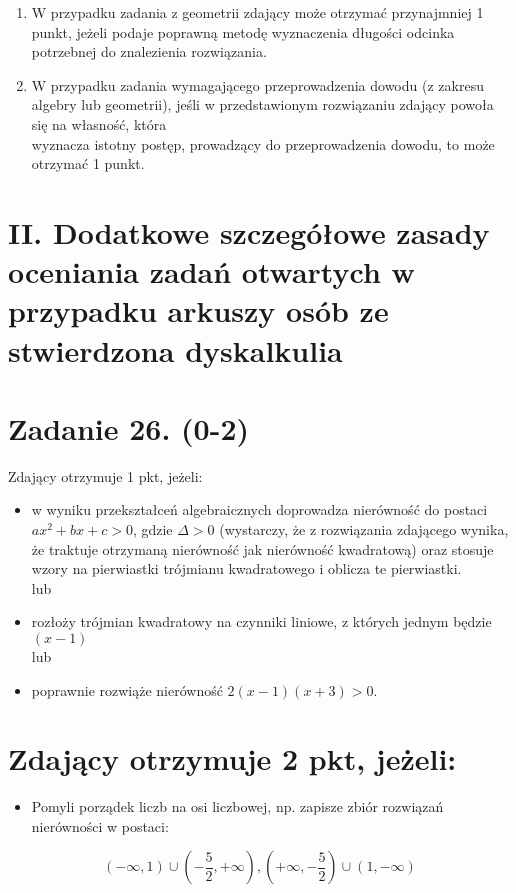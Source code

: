 \documentclass[10pt]{article}
\begin{document}
\begin{enumerate}
  \item W przypadku zadania z geometrii zdający może otrzymać przynajmniej 1 punkt, jeżeli podaje poprawną metodę wyznaczenia długości odcinka potrzebnej do znalezienia rozwiązania.
  \item W przypadku zadania wymagającego przeprowadzenia dowodu (z zakresu algebry lub geometrii), jeśli w przedstawionym rozwiązaniu zdający powoła się na własność, która\\
wyznacza istotny postęp, prowadzący do przeprowadzenia dowodu, to może otrzymać 1 punkt.
\end{enumerate}

\section*{II. Dodatkowe szczegółowe zasady oceniania zadań otwartych w przypadku arkuszy osób ze stwierdzona dyskalkulia}
\section*{Zadanie 26. (0-2)}
Zdający otrzymuje 1 pkt, jeżeli:

\begin{itemize}
  \item w wyniku przekształceń algebraicznych doprowadza nierówność do postaci $a x^{2}+b x+c>0$, gdzie $\Delta>0$ (wystarczy, że z rozwiązania zdającego wynika, że traktuje otrzymaną nierówność jak nierówność kwadratową) oraz stosuje wzory na pierwiastki trójmianu kwadratowego i oblicza te pierwiastki.\\
lub
  \item rozłoży trójmian kwadratowy na czynniki liniowe, z których jednym będzie $(x-1)$\\
lub
  \item poprawnie rozwiąże nierówność $2(x-1)(x+3)>0$.
\end{itemize}

\section*{Zdający otrzymuje 2 pkt, jeżeli:}
\begin{itemize}
  \item Pomyli porządek liczb na osi liczbowej, np. zapisze zbiór rozwiązań nierówności w postaci:
\end{itemize}

$$
(-\infty, 1) \cup\left(-\frac{5}{2},+\infty\right),\left(+\infty,-\frac{5}{2}\right) \cup(1,-\infty)
$$
\end{document}
